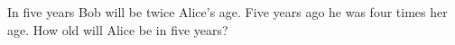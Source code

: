 In five years Bob will be twice Alice's age. Five years ago he was four times her age. How old will Alice be in five years?
